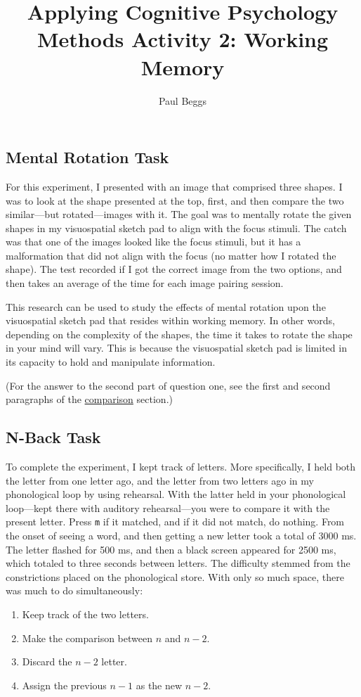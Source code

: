 \documentclass[stu,12pt,floatsintext]{apa7}
\title{Applying Cognitive Psychology Methods Activity 2: Working Memory} %
\author{Paul Beggs}
\begin{document}
\maketitle %

\subsection{Mental Rotation Task}

    For this experiment, I presented with an image that comprised three shapes. I was to look at the shape presented at the top, first, and then compare the two similar---but rotated---images with it. The goal was to mentally rotate the given shapes in my visuospatial sketch pad to align with the focus stimuli. The catch was that one of the images looked like the focus stimuli, but it has a malformation that did not align with the focus (no matter how I rotated the shape). The test recorded if I got the correct image from the two options, and then takes an average of the time for each image pairing session.

    This research can be used to study the effects of mental rotation upon the visuospatial sketch pad that resides within working memory. In other words, depending on the complexity of the shapes, the time it takes to rotate the shape in your mind will vary. This is because the visuospatial sketch pad is limited in its capacity to hold and manipulate information. 

    (For the answer to the second part of question one, see the first and second paragraphs of the \hyperlink{comparison}{comparison} section.)

    

\subsection{N-Back Task}

To complete the experiment, I kept track of letters. More specifically, I held both the letter from one letter ago, and the letter from two letters ago in my phonological loop by using rehearsal. With the latter held in your phonological loop---kept there with auditory rehearsal---you were to compare it with the present letter. Press \texttt{m} if it matched, and if it did not match, do nothing. From the onset of seeing a word, and then getting a new letter took a total of 3000 ms. The letter flashed for 500 ms, and then a black screen appeared for 2500 ms, which totaled to three seconds between letters. The difficulty stemmed from the constrictions placed on the phonological store. With only so much space, there was much to do simultaneously:
\begin{enumerate}
    \item Keep track of the two letters.
    \item Make the comparison between \(n\) and \(n - 2\).
    \item Discard the \(n - 2\) letter.
    \item Assign the previous \(n - 1\) as the new \(n - 2\).
\end{enumerate}
\end{document}
